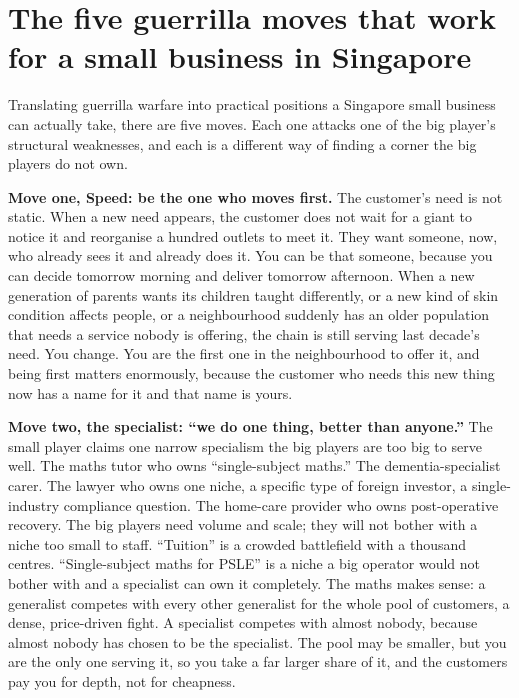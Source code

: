\documentclass[10pt,twoside,openany]{memoir}
\newcommand{\needspacehead}{\needspace{4\baselineskip}}
\let\oldsection\section
\renewcommand{\section}{\needspacehead\oldsection}
\begin{document}
{\section{The five guerrilla moves that work for a small business in
Singapore}\label{the-five-guerrilla-moves-that-work-for-a-small-business-in-singapore}

Translating guerrilla warfare into practical positions a Singapore small
business can actually take, there are five moves. Each one attacks one
of the big player's structural weaknesses, and each is a different way
of finding a corner the big players do not own.

\textbf{Move one, Speed: be the one who moves first.} The customer's
need is not static. When a new need appears, the customer does not wait
for a giant to notice it and reorganise a hundred outlets to meet it.
They want someone, now, who already sees it and already does it. You can
be that someone, because you can decide tomorrow morning and deliver
tomorrow afternoon. When a new generation of parents wants its children
taught differently, or a new kind of skin condition affects people, or a
neighbourhood suddenly has an older population that needs a service
nobody is offering, the chain is still serving last decade's need. You
change. You are the first one in the neighbourhood to offer it, and
being first matters enormously, because the customer who needs this new
thing now has a name for it and that name is yours.

\textbf{Move two, the specialist: ``we do one thing, better than
anyone.''} The small player claims one narrow specialism the big players
are too big to serve well. The maths tutor who owns ``single-subject
maths.'' The dementia-specialist carer. The lawyer who owns one niche, a
specific type of foreign investor, a single-industry compliance
question. The home-care provider who owns post-operative recovery. The
big players need volume and scale; they will not bother with a niche too
small to staff. ``Tuition'' is a crowded battlefield with a thousand
centres. ``Single-subject maths for PSLE'' is a niche a big operator
would not bother with and a specialist can own it completely. The maths
makes sense: a generalist competes with every other generalist for the
whole pool of customers, a dense, price-driven fight. A specialist
competes with almost nobody, because almost nobody has chosen to be the
specialist. The pool may be smaller, but you are the only one serving
it, so you take a far larger share of it, and the customers pay you for
depth, not for cheapness.

}
\end{document}
